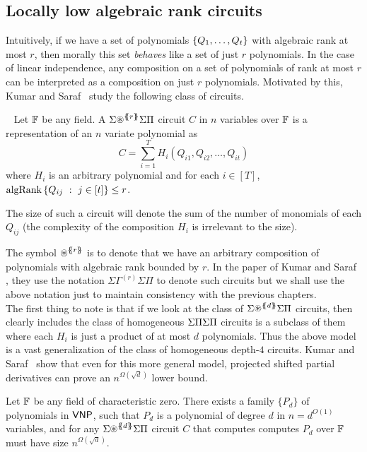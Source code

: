 \subsection{Locally low algebraic rank circuits}


Intuitively, if we have a set of polynomials $\left\{Q_1,\ldots, Q_t\right\}$ with algebraic rank at most $r$, then morally this set \emph{behaves} like a set of just $r$ polynomials. In the case of linear independence, any composition on a set of polynomials of rank at most $r$ can be interpreted as a composition on just $r$ polynomials. Motivated by this, Kumar and Saraf~\cite{KS16lowrank} study the following class of circuits. 

\begin{definition}~\label{def:lb model}
Let $\mathbb{F}$ be any field. A $\SASP{r}$ circuit $C$ in $n$ variables over $\mathbb{F}$ is a representation of an $n$ variate polynomial as 
\[C =  \sum_{i = 1}^T  H_i(Q_{i1},  Q_{i2},  \ldots, Q_{it}) \]  
where $H_i$ is an arbitrary polynomial and for each $i\in [T]$, $\operatorname{\mathrm{algRank}}\left\{{Q_{ij}}\ : \ {j\in [t]}\right\} \leq r$. 

The size of such a circuit will denote the sum of the number of monomials of each $Q_{ij}$ (the complexity of the composition $H_i$ is irrelevant to the size). 
\end{definition}

The symbol $\circast^{\set{\!\!\set{r}\!\!}}$ is to denote that we have an arbitrary composition of polynomials with algebraic rank bounded by $r$.
In the paper of Kumar and Saraf \cite{KS16lowrank}, they use the notation $\Sigma\Gamma^{(r)}\Sigma\Pi$ to denote such circuits but we shall use the above notation just to maintain consistency with the previous chapters. \\

The first thing to note is that if we look at the class of $\SASP{d}$ circuits, then clearly includes the class of homogeneous $\Sigma\Pi\Sigma\Pi$ circuits is a subclass of them where each $H_i$ is just a product of at most $d$ polynomials. Thus the above model is a vast generalization of the class of homogeneous depth-$4$ circuits. Kumar and Saraf~\cite{KS16lowrank} show that even for this more general model, projected shifted partial derivatives can prove an $n^{\Omega(\sqrt{d})}$ lower bound. 

\begin{theorem} \label{thm:locally-lowalgrank}
Let $\mathbb{F}$ be any field of characteristic zero. There exists a family $\{P_d\}$ of polynomials in $\mathsf{VNP}$, such that $P_d$ is a polynomial of degree $d$ in $n = d^{O(1)}$ variables, and for any $\SASP{d}$ circuit $C$ that computes computes $P_d$ over $\mathbb{F}$ must have size $n^{\Omega(\sqrt{d})}$.
\end{theorem} 

